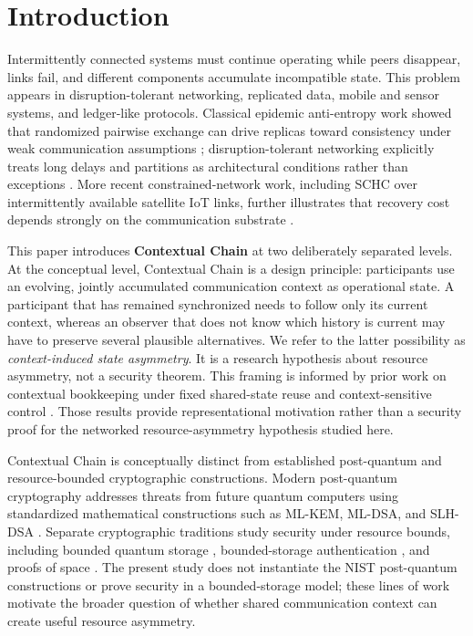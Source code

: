 \documentclass[11pt]{article}
\begin{document}
\section{Introduction}
Intermittently connected systems must continue operating while peers disappear, links fail, and different components accumulate incompatible state. This problem appears in disruption-tolerant networking, replicated data, mobile and sensor systems, and ledger-like protocols. Classical epidemic anti-entropy work showed that randomized pairwise exchange can drive replicas toward consistency under weak communication assumptions \cite{Demers1987Epidemic}; disruption-tolerant networking explicitly treats long delays and partitions as architectural conditions rather than exceptions \cite{Cerf2007DTN}. More recent constrained-network work, including SCHC over intermittently available satellite IoT links, further illustrates that recovery cost depends strongly on the communication substrate \cite{MunozLara2026SCHC}.

This paper introduces \textbf{Contextual Chain} at two deliberately separated levels. At the conceptual level, Contextual Chain is a design principle: participants use an evolving, jointly accumulated communication context as operational state. A participant that has remained synchronized needs to follow only its current context, whereas an observer that does not know which history is current may have to preserve several plausible alternatives. We refer to the latter possibility as \emph{context-induced state asymmetry}. It is a research hypothesis about resource asymmetry, not a security theorem.
This framing is informed by prior work on contextual bookkeeping under fixed shared-state reuse and context-sensitive control \cite{KimBookkeeping2026,KimNogo2026,KimControl2026}. Those results provide representational motivation rather than a security proof for the networked resource-asymmetry hypothesis studied here.

Contextual Chain is conceptually distinct from established post-quantum and resource-bounded cryptographic constructions. Modern post-quantum cryptography addresses threats from future quantum computers using standardized mathematical constructions such as ML-KEM, ML-DSA, and SLH-DSA \cite{NISTFIPS203,NISTFIPS204,NISTFIPS205}. Separate cryptographic traditions study security under resource bounds, including bounded quantum storage \cite{Damgard2008BQSM}, bounded-storage authentication \cite{Dodis2022Authentication}, and proofs of space \cite{Dziembowski2015ProofsSpace}. The present study does not instantiate the NIST post-quantum constructions or prove security in a bounded-storage model; these lines of work motivate the broader question of whether shared communication context can create useful resource asymmetry.
\end{document}
